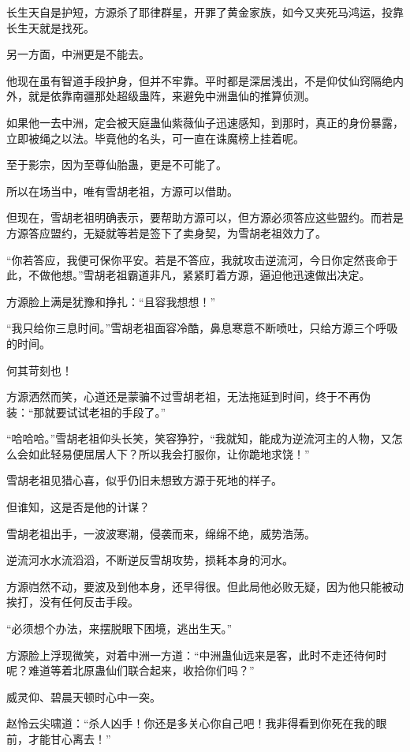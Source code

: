 \begin{this_body}
长生天自是护短，方源杀了耶律群星，开罪了黄金家族，如今又夹死马鸿运，投靠长生天就是找死。

另一方面，中洲更是不能去。

他现在虽有智道手段护身，但并不牢靠。平时都是深居浅出，不是仰仗仙窍隔绝内外，就是依靠南疆那处超级蛊阵，来避免中洲蛊仙的推算侦测。

如果他一去中洲，定会被天庭蛊仙紫薇仙子迅速感知，到那时，真正的身份暴露，立即被绳之以法。毕竟他的名头，可一直在诛魔榜上挂着呢。

至于影宗，因为至尊仙胎蛊，更是不可能了。

所以在场当中，唯有雪胡老祖，方源可以借助。

但现在，雪胡老祖明确表示，要帮助方源可以，但方源必须答应这些盟约。而若是方源答应盟约，无疑就等若是签下了卖身契，为雪胡老祖效力了。

“你若答应，我便可保你平安。若是不答应，我就攻击逆流河，今日你定然丧命于此，不做他想。”雪胡老祖霸道非凡，紧紧盯着方源，逼迫他迅速做出决定。

方源脸上满是犹豫和挣扎：“且容我想想！”

“我只给你三息时间。”雪胡老祖面容冷酷，鼻息寒意不断喷吐，只给方源三个呼吸的时间。

何其苛刻也！

方源洒然而笑，心道还是蒙骗不过雪胡老祖，无法拖延到时间，终于不再伪装：“那就要试试老祖的手段了。”

“哈哈哈。”雪胡老祖仰头长笑，笑容狰狞，“我就知，能成为逆流河主的人物，又怎么会如此轻易便屈居人下？所以我会打服你，让你跪地求饶！”

雪胡老祖见猎心喜，似乎仍旧未想致方源于死地的样子。

但谁知，这是否是他的计谋？

雪胡老祖出手，一波波寒潮，侵袭而来，绵绵不绝，威势浩荡。

逆流河水水流滔滔，不断逆反雪胡攻势，损耗本身的河水。

方源岿然不动，要波及到他本身，还早得很。但此局他必败无疑，因为他只能被动挨打，没有任何反击手段。

“必须想个办法，来摆脱眼下困境，逃出生天。”

方源脸上浮现微笑，对着中洲一方道：“中洲蛊仙远来是客，此时不走还待何时呢？难道等着北原蛊仙们联合起来，收拾你们吗？”

威灵仰、碧晨天顿时心中一突。

赵怜云尖啸道：“杀人凶手！你还是多关心你自己吧！我非得看到你死在我的眼前，才能甘心离去！”


\end{this_body}
